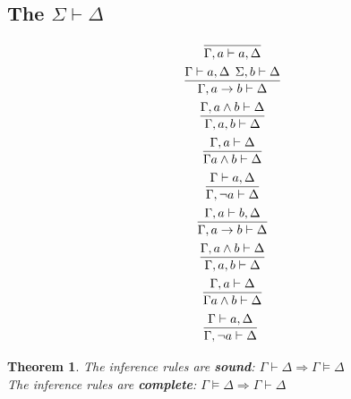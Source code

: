 \documentclass{article}
\theoremstyle{sltheorem}
\newtheorem{theorem}{Theorem}
\begin{document}
\subsection{The $\Sigma \vdash \Delta$}
\begin{gather*}
    \infer{\Gamma, a\vdash a, \Delta}{}\\
    \infer{\Gamma, a \to b \vdash \Delta}{\Gamma \vdash a, \Delta\:\:\Sigma,b\vdash \Delta}\\
    \infer{\Gamma,a,b\vdash \Delta}{\Gamma,a\wedge b\vdash \Delta}\\ 
    \infer{\Gamma a\wedge b\vdash \Delta}{\Gamma, a\vdash \Delta}\\ 
    \infer{\Gamma,\neg a\vdash\Delta}{\Gamma\vdash a,\Delta}\\
    \infer{\Gamma, a \to b \vdash \Delta}{\Gamma,a\vdash b, \Delta}\\
    \infer{\Gamma,a,b\vdash \Delta}{\Gamma,a\wedge b\vdash \Delta}\\ 
    \infer{\Gamma a\wedge b\vdash \Delta}{\Gamma, a\vdash \Delta}\\ 
    \infer{\Gamma,\neg a\vdash\Delta}{\Gamma\vdash a,\Delta}
\
\end{gather*}
\begin{theorem}
    The inference rules are \textbf{sound}: $\Gamma\vdash\Delta \Rightarrow \Gamma\vDash \Delta$\\
    The inference rules are \textbf{complete}: $\Gamma\vDash\Delta\Rightarrow\Gamma\vdash\Delta$
\end{theorem}
\end{document}

